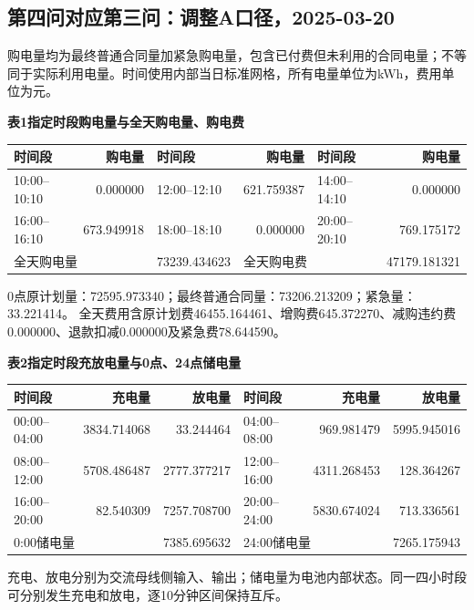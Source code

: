 \subsection{第四问对应第三问：调整A口径，2025-03-20}
\begingroup\small
\setlength{\tabcolsep}{4pt}\renewcommand{\arraystretch}{1.08}
\setlength{\LTpre}{4pt}\setlength{\LTpost}{4pt}
\noindent 购电量均为最终普通合同量加紧急购电量，包含已付费但未利用的合同电量；不等同于实际利用电量。时间使用内部当日标准网格，所有电量单位为kWh，费用单位为元。
\begin{center}\textbf{表1\quad 指定时段购电量与全天购电量、购电费}\par\smallskip
\begin{tabular}{lr lr lr}\toprule
时间段 & 购电量 & 时间段 & 购电量 & 时间段 & 购电量\\\midrule
10:00--10:10 & 0.000000 & 12:00--12:10 & 621.759387 & 14:00--14:10 & 0.000000\\
16:00--16:10 & 673.949918 & 18:00--18:10 & 0.000000 & 20:00--20:10 & 769.175172\\
\midrule
\multicolumn{2}{l}{全天购电量} & 73239.434623 & \multicolumn{2}{l}{全天购电费} & 47179.181321\\
\bottomrule\end{tabular}\end{center}
\noindent 0点原计划量：72595.973340；最终普通合同量：73206.213209；紧急量：33.221414。
全天费用含原计划费46455.164461、增购费645.372270、减购违约费0.000000、退款扣减0.000000及紧急费78.644590。
\begin{center}\textbf{表2\quad 指定时段充放电量与0点、24点储电量}\par\smallskip
\begin{tabular}{lrr lrr}\toprule
时间段 & 充电量 & 放电量 & 时间段 & 充电量 & 放电量\\\midrule
00:00--04:00 & 3834.714068 & 33.244464 & 04:00--08:00 & 969.981479 & 5995.945016\\
08:00--12:00 & 5708.486487 & 2777.377217 & 12:00--16:00 & 4311.268453 & 128.364267\\
16:00--20:00 & 82.540309 & 7257.708700 & 20:00--24:00 & 5830.674024 & 713.336561\\
\midrule
\multicolumn{2}{l}{0:00储电量} & 7385.695632 & \multicolumn{2}{l}{24:00储电量} & 7265.175943\\
\bottomrule\end{tabular}\end{center}
\noindent 充电、放电分别为交流母线侧输入、输出；储电量为电池内部状态。同一四小时段可分别发生充电和放电，逐10分钟区间保持互斥。
